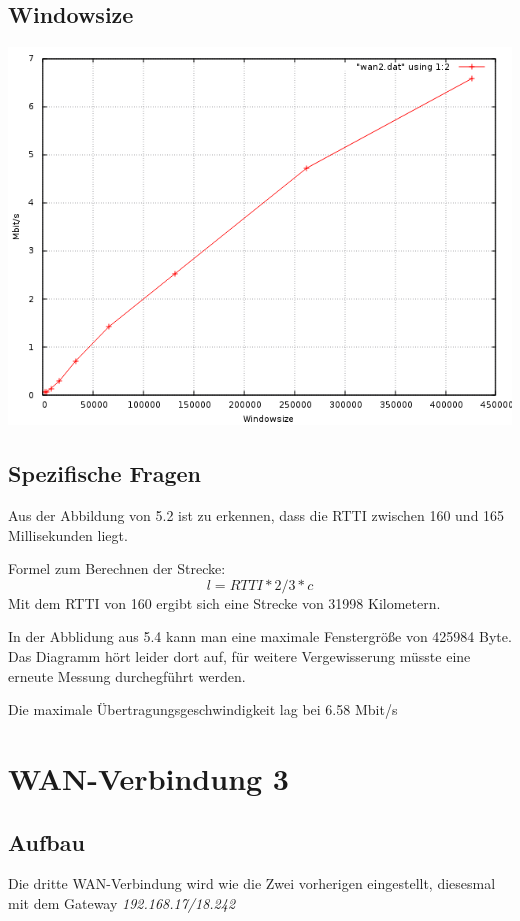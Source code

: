 \documentclass[a4paper,10pt]{article}
\begin{document}
\subsection{Windowsize}
\includegraphics[scale=0.75]{wan2_windows.png}

\subsection{Spezifische Fragen}
\begin{itemize}
 \item Aus der Abbildung von 5.2 ist zu erkennen, dass die RTTI zwischen 160 und 165 Millisekunden liegt.
 \item {Formel zum Berechnen der Strecke: 
 \begin{equation}
  l=RTTI*2/3*c
 \end{equation}
 Mit dem RTTI von 160 ergibt sich eine Strecke von 31998 Kilometern.
 \item In der Abblidung aus 5.4 kann man eine maximale Fenstergröße von 425984 Byte. Das Diagramm hört leider dort auf, 
 für weitere Vergewisserung müsste eine erneute Messung durchegführt werden.}
 \item Die maximale Übertragungsgeschwindigkeit lag bei 6.58 Mbit/s
\end{itemize}

\section{WAN-Verbindung 3}

\subsection{Aufbau}
Die dritte WAN-Verbindung wird wie die Zwei vorherigen eingestellt, diesesmal mit dem Gateway \textit{192.168.17/18.242}
\end{document}
